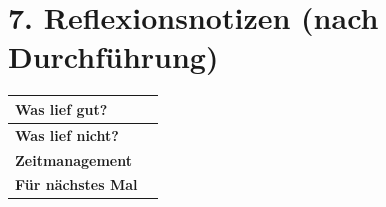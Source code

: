 \documentclass[11pt, a4paper]{article}
\begin{document}

\section*{7. Reflexionsnotizen (nach Durchführung)}

\begin{tabularx}{\textwidth}{|l|X|}
\hline
\textbf{Was lief gut?} & \\[2em]
\hline
\textbf{Was lief nicht?} & \\[2em]
\hline
\textbf{Zeitmanagement} & \\[2em]
\hline
\textbf{Für nächstes Mal} & \\[2em]
\hline
\end{tabularx}
\end{document}
